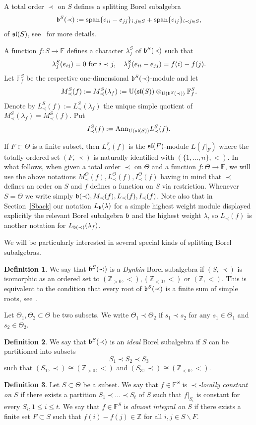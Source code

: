 \documentclass[10pt]{amsart}\oddsidemargin -1mm \evensidemargin -1mm \topmargin -15mm\headheight5mm \headsep 3.5mm \textheight 245mm\textwidth 170mm
\theoremstyle{definition}\newtheorem{theorem}{Theorem}[section]\newtheorem{lemma}[theorem]{Lemma}\newtheorem{remark}[theorem]{Remark}\newtheorem{proposition}[theorem]{Proposition}\newtheorem{corollary}[theorem]{Corollary}\newtheorem{definition}[theorem]{Definition}\newtheorem{Ex}[theorem]{Example}\newtheorem{obs}[theorem]{Observation}\newtheorem{nota}[theorem]{Notation}
\begin{document}
A total order $\prec$ on $S$ defines a splitting Borel subalgebra
$$\frak b^S(\prec):={\rm span}\{e_{ii}-e_{jj}\}_{i, j\in S}+{\rm span}\{e_{ij}\}_{i\prec j\in S},$$
of $\frak{sl}(S)$, see~\cite{PP2} for more details.

A function $f: S\to\mathbb F$ defines a character $\lambda^S_f$ of $\frak b^S(\prec)$ such that 
$$\lambda^S_f(e_{ij})=0{\rm~for}~i\prec j,\hspace{10pt}\lambda^S_f(e_{ii}-e_{jj})=f(i)-f(j).$$
Let $\mathbb F^S_f$ be the respective one-dimensional $\frak b^S(\prec)$-module and let
$$M^S_\prec(f):=M^S_\prec(\lambda_f):={\rm U}(\frak{sl}(S))\otimes_{{\rm U}(\frak b^S(\prec))}\mathbb F^S_f.$$
Denote by $L^S_\prec(f):=L^S_\prec(\lambda_f)$ the unique simple quotient of $M^S_\prec(\lambda_f)=M^S_\prec(f)$. Put $$I_\prec^S(f):={\rm Ann}_{{\rm U}(\frak{sl}(S))}L^S_\prec(f).$$

If $F\subset\Theta$ is a finite subset, then $L_\prec^F(f)$ is the $\frak{sl}(F)$-module $L(f|_F)$ where the totally ordered set $(F, \prec)$ is naturally identified with $(\{1,..., n\}, <)$. 
In what follows, when given a total order $\prec$ on $\Theta$ and a function $f: \Theta\to\mathbb F$, we will use the above notations $M^\Theta_\prec(f), L^\Theta_\prec(f), I^\Theta_\prec(f)$ having in mind that $\prec$ defines an order on $S$ and $f$ defines a function on $S$ via restriction. 
Whenever $S=\Theta$ we write simply $\frak b(\prec), M_\prec(f), L_\prec(f), I_\prec(f)$. 
Note also that in Section~\ref{Sback} our notation $L_\frak b(\lambda)$ for a simple highest weight module displayed explicitly the relevant Borel subalgebra $\frak b$ and the highest weight $\lambda$, so $L_\prec(f)$ is another notation for $L_{\frak b(\prec)}(\lambda_f)$.


We will be particularly interested in several special kinds of splitting Borel subalgebras. 
\begin{definition} We say that $\frak b^S(\prec)$ is a {\it Dynkin} Borel subalgebra if $(S, \prec)$ is isomorphic as an ordered set to $(\mathbb Z_{>0}, <), (\mathbb Z_{<0}, <)$ or $(\mathbb Z, <)$. 
This is equivalent to the condition that every root of $\frak b^S(\prec)$ is a finite sum of simple roots, see~\cite{Th}.
\end{definition}
Let $\Theta_1, \Theta_2\subset\Theta$ be two subsets. 
We write $\Theta_1\prec \Theta_2$ if $s_1\prec s_2$ for any $s_1\in \Theta_1$ and $s_2\in \Theta_2$.
\begin{definition} We say that $\frak b^S(\prec)$ is an {\it ideal} Borel subalgebra if $S$ can be partitioned into subsets $$S_1\prec S_2\prec S_3$$ such that $(S_1, \prec)\cong (\mathbb Z_{> 0}, <)$ and $(S_3, \prec)\cong (\mathbb Z_{<0}, <)$.\end{definition}
\begin{definition} Let $S\subset\Theta$ be a subset. We say that $f\in\mathbb F^S$ is {\it $\prec$-locally constant on $S$} if there exists a partition $S_1\prec...\prec S_t$ of $S$ such that $f|_{S_i}$ is constant for every $S_i, 1\le i\le t$. 
We say that $f\in\mathbb F^S$ is {\it almost integral on $S$} if there exists a finite set $F \subset S$ such that $f(i)-f(j)\in\mathbb Z$ for all $i, j\in S\backslash F$.\end{definition}
\end{document}
